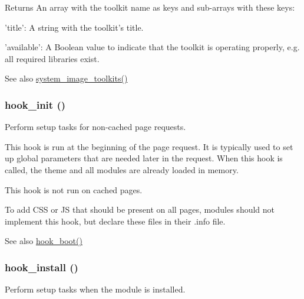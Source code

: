 \begin{DoxyReturn}{Returns}
An array with the toolkit name as keys and sub-\/arrays with these keys:
\begin{DoxyItemize}
\item 'title': A string with the toolkit's title.
\item 'available': A Boolean value to indicate that the toolkit is operating properly, e.g. all required libraries exist.
\end{DoxyItemize}
\end{DoxyReturn}
\begin{DoxySeeAlso}{See also}
\hyperlink{system_8module_ac5de4c1bb1b8395a6a074df170cbe335}{system\_\-image\_\-toolkits()} 
\end{DoxySeeAlso}
\hypertarget{group__hooks_ga74edef0c463436fdbb1f92ef367db051}{
\subsubsection[{hook\_\-init}]{\setlength{\rightskip}{0pt plus 5cm}hook\_\-init ()}}
\label{group__hooks_ga74edef0c463436fdbb1f92ef367db051}
Perform setup tasks for non-\/cached page requests.

This hook is run at the beginning of the page request. It is typically used to set up global parameters that are needed later in the request. When this hook is called, the theme and all modules are already loaded in memory.

This hook is not run on cached pages.

To add CSS or JS that should be present on all pages, modules should not implement this hook, but declare these files in their .info file.

\begin{DoxySeeAlso}{See also}
\hyperlink{group__hooks_ga9ac1dfffdc69471a3d00d67503c71577}{hook\_\-boot()} 
\end{DoxySeeAlso}
\hypertarget{group__hooks_ga1ecdb5a2a046ea63dc790c3ed90338e5}{
\subsubsection[{hook\_\-install}]{\setlength{\rightskip}{0pt plus 5cm}hook\_\-install ()}}
\label{group__hooks_ga1ecdb5a2a046ea63dc790c3ed90338e5}
Perform setup tasks when the module is installed.

